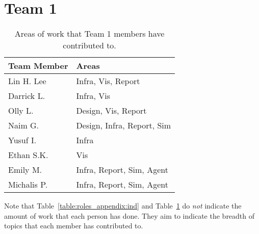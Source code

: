 \section{Team 1}
\label{sec:roles_appendix:team1}

\begin{table}[H]
    \centering
    \begin{tabular}{|l|l|}
    \hline
    \textbf{Team Member} & \textbf{Areas}     \\ \hline
    Lin H. Lee  & Infra, Vis, Report         \\
    Darrick L.  & Infra, Vis                 \\
    Olly L.     & Design, Vis, Report        \\
    Naim G.     & Design, Infra, Report, Sim \\
    Yusuf I.    & Infra                      \\
    Ethan S.K.  & Vis                        \\
    Emily M.    & Infra, Report, Sim, Agent  \\
    Michalis P. & Infra, Report, Sim, Agent  \\ \hline
\end{tabular}
\caption{Areas of work that Team 1 members have contributed to.}
\label{sec:roles_appendix:team1}
\end{table}



Note that Table~\ref{table:roles_appendix:ind} and Table~\ref{sec:roles_appendix:team1} do \emph{not} indicate the amount of work that each person has done. They aim to indicate the breadth of topics that each member has contributed to. 
